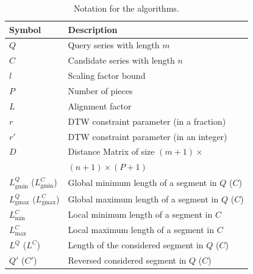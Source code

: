 \begin{table}[htbp] %
\centering
\caption{Notation for the algorithms.}
\label{tab:algorithm_legend}
\begin{tabular}{ll}
\hline
\textbf{Symbol} & \textbf{Description} \\ \hline
$Q$ & Query series with length $m$ \\
$C$ & Candidate series with length $n$ \\
$l$ & Scaling factor bound \\
$P$ & Number of pieces \\
$L$ & Alignment factor \\
$r$ & DTW constraint parameter (in a fraction) \\
$r'$ & DTW constraint parameter (in an integer) \\
$D$ & Distance Matrix of size $(m + 1) \times$\\
& $(n + 1) \times (P + 1)$ \\
$L_{\mathrm{gmin}}^Q$ ($L_{\mathrm{gmin}}^C$) & Global minimum length of a segment in $Q$ ($C$) \\
$L_{\mathrm{gmax}}^Q$ ($L_{\mathrm{gmax}}^C$) & Global maximum length of a segment in $Q$ ($C$) \\
$L_{\mathrm{min}}^C$ & Local minimum length of a segment in $C$ \\
$L_{\mathrm{max}}^C$ & Local maximum length of a segment in $C$ \\
$L^Q$ ($L^C$) & Length of the considered segment in $Q$ ($C$) \\
$Q'$ ($C'$) & Reversed considered segment in $Q$ ($C$) \\
\hline
\end{tabular}
\end{table}